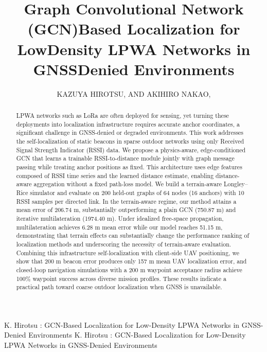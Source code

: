 \documentclass{ieeeaccess}
\begin{document}

\title{Graph Convolutional Network (GCN)\textendash Based Localization for Low\textendash Density LPWA Networks in GNSS\textendash Denied Environments}

\author{\uppercase{Kazuya Hirotsu},
\uppercase{and Akihiro Nakao}, }

\address[1]{School of Engineering, The University of Tokyo, Tokyo, 113-8654, Japan}

\markboth
{K. Hirotsu \headeretal: GCN-Based Localization for Low-Density LPWA Networks in GNSS-Denied Environments}
{K. Hirotsu \headeretal: GCN-Based Localization for Low-Density LPWA Networks in GNSS-Denied Environments}


\begin{abstract}
LPWA networks such as LoRa are often deployed for sensing, yet turning these deployments into localization infrastructure requires accurate anchor coordinates, a significant challenge in GNSS-denied or degraded environments. This work addresses the self-localization of static beacons in sparse outdoor networks using only Received Signal Strength Indicator (RSSI) data. We propose a physics-aware, edge-conditioned GCN that learns a trainable RSSI-to-distance module jointly with graph message passing while treating anchor positions as fixed. This architecture uses edge features composed of RSSI time series and the learned distance estimate, enabling distance-aware aggregation without a fixed path-loss model. We build a terrain-aware Longley--Rice simulator and evaluate on 200 held-out graphs of 64 nodes (16 anchors) with 10 RSSI samples per directed link. In the terrain-aware regime, our method attains a mean error of 206.74 m, substantially outperforming a plain GCN (750.87 m) and iterative multilateration (1974.40 m). Under idealized free-space propagation, multilateration achieves 6.28 m mean error while our model reaches 51.15 m, demonstrating that terrain effects can substantially change the performance ranking of localization methods and underscoring the necessity of terrain-aware evaluation. Combining this infrastructure self-localization with client-side UAV positioning, we show that 200 m beacon error produces only 157 m mean UAV localization error, and closed-loop navigation simulations with a 200 m waypoint acceptance radius achieve 100\% waypoint success across diverse mission profiles. These results indicate a practical path toward coarse outdoor localization when GNSS is unavailable.
\end{abstract}
\end{document}
